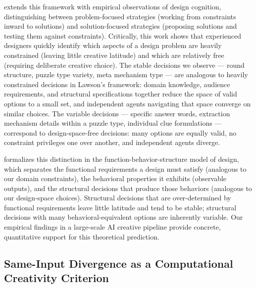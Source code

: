 \citet{lawson1997designers} extends this framework with empirical observations of design cognition, distinguishing between problem-focused strategies (working from constraints inward to solutions) and solution-focused strategies (proposing solutions and testing them against constraints). Critically, this work shows that experienced designers quickly identify which aspects of a design problem are heavily constrained (leaving little creative latitude) and which are relatively free (requiring deliberate creative choice). The stable decisions we observe --- round structure, puzzle type variety, meta mechanism type --- are analogous to heavily constrained decisions in Lawson's framework: domain knowledge, audience requirements, and structural specifications together reduce the space of valid options to a small set, and independent agents navigating that space converge on similar choices. The variable decisions --- specific answer words, extraction mechanism details within a puzzle type, individual clue formulations --- correspond to design-space-free decisions: many options are equally valid, no constraint privileges one over another, and independent agents diverge.

\citet{gero1990design} formalizes this distinction in the function-behavior-structure model of design, which separates the functional requirements a design must satisfy (analogous to our domain constraints), the behavioral properties it exhibits (observable outputs), and the structural decisions that produce those behaviors (analogous to our design-space choices). Structural decisions that are over-determined by functional requirements leave little latitude and tend to be stable; structural decisions with many behavioral-equivalent options are inherently variable. Our empirical findings in a large-scale AI creative pipeline provide concrete, quantitative support for this theoretical prediction.

\subsection{Same-Input Divergence as a Computational Creativity Criterion}

